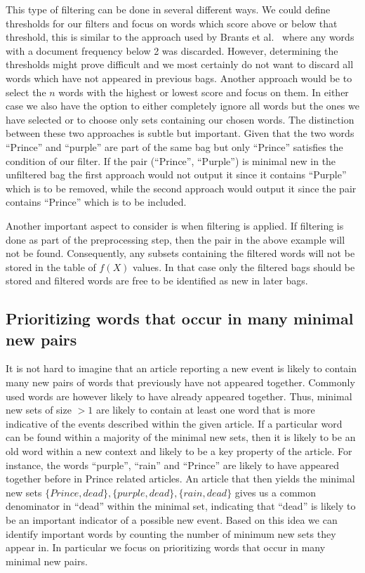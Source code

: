 This type of filtering can be done in several different ways. We could define thresholds for our filters and focus on words which score above or below that threshold, this is similar to the approach used by Brants et al.~\cite{brants2003system} where any words with a document frequency below 2 was discarded. However, determining the thresholds might prove difficult and we most certainly do not want to discard all words which have not appeared in previous bags. Another approach would be to select the $n$ words with the highest or lowest score and focus on them. In either case we also have the option to either completely ignore all words but the ones we have selected or to choose only sets containing our chosen words. The distinction between these two approaches is subtle but important. Given that the two words ``Prince'' and ``purple'' are part of the same bag but only ``Prince'' satisfies the condition of our filter. If the pair (``Prince'', ``Purple'') is minimal new in the unfiltered bag the first approach would not output it since it contains ``Purple'' which is to be removed, while the second approach would output it since the pair contains ``Prince'' which is to be included. 

Another important aspect to consider is when filtering is applied. If filtering is done as part of the preprocessing step, then the pair in the above example will not be found. Consequently, any subsets containing the filtered words will not be stored in the table of $f(X)$ values. In that case only the filtered bags should be stored and filtered words are free to be identified as new in later bags. 

\subsection{Prioritizing words that occur in many minimal new pairs}
It is not hard to imagine that an article reporting a new event is likely to contain many new pairs of words that previously have not appeared together. Commonly used words are however likely to have already appeared together. Thus, minimal new sets of size $>1$ are likely to contain at least one word that is more indicative of the events described within the given article. If a particular word can be found within a majority of the minimal new sets, then it is likely to be an old word within a new context and likely to be a key property of the article. For instance, the words ``purple'', ``rain'' and ``Prince'' are likely to have appeared together before in Prince related articles. An article that then yields the minimal new sets $\{Prince, dead\}, \{purple, dead\}, \{rain, dead\}$ gives us a  common denominator in ``dead'' within the minimal set, indicating that ``dead'' is likely to be an important indicator of a possible new event. Based on this idea we can identify important words by counting the number of minimum new sets they appear in. In particular we focus on prioritizing words that occur in many minimal new pairs.

